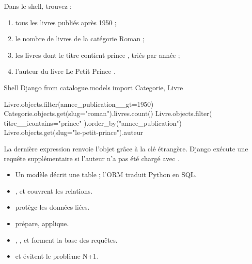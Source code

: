 \begin{exercice}[ : requêtes]
Dans le shell, trouvez :
\begin{enumerate}
  \item tous les livres publiés après 1950 ;
  \item le nombre de livres de la catégorie \og Roman \fg ;
  \item les livres dont le titre contient \og prince \fg, triés par année ;
  \item l'auteur du livre \og Le Petit Prince \fg.
\end{enumerate}
\end{exercice}

\begin{correction}
\begin{codebox}[python]{Shell Django}
from catalogue.models import Categorie, Livre

Livre.objects.filter(annee_publication__gt=1950)
Categorie.objects.get(slug="roman").livres.count()
Livre.objects.filter(
    titre__icontains="prince"
).order_by("annee_publication")
Livre.objects.get(slug="le-petit-prince").auteur
\end{codebox}

La dernière expression renvoie l'objet  grâce à la clé étrangère.
Django exécute une requête supplémentaire si l'auteur n'a pas été chargé avec
.
\end{correction}

\begin{retenir}
\begin{itemize}
  \item Un modèle décrit une table ; l'ORM traduit Python en SQL.
  \item {},  et  couvrent
        les relations.
  \item {} protège les données liées.
  \item {} prépare,  applique.
  \item {}, ,  et  forment la
        base des requêtes.
  \item {} et  évitent le problème
        N+1.
\end{itemize}
\end{retenir}
